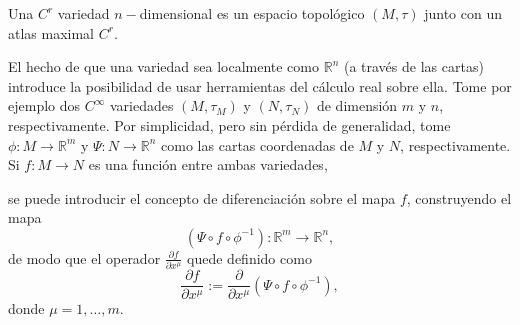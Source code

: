 \begin{center}
\end{center}
\begin{defi}
	Una $C^r$ variedad $n-$dimensional es un espacio topológico $(M,\tau)$ junto con un atlas maximal $C^r$.
\end{defi}
El hecho de que una variedad sea localmente como $\mathbb{R}^n$ (a través de las cartas) introduce la posibilidad de usar herramientas del cálculo real sobre ella. Tome por ejemplo dos $C^\infty$ variedades $(M,\tau_M)$ y $(N,\tau_N)$ de dimensión $m$ y $n$, respectivamente. Por simplicidad, pero sin pérdida de generalidad, tome $\phi:M\rightarrow\mathbb{R}^m$ y $\Psi:N\rightarrow\mathbb{R}^n$ como las cartas coordenadas de $M$ y $N$, respectivamente. Si $f:M\rightarrow N$ es una función entre ambas variedades,

\begin{center}
\end{center}
se puede introducir el concepto de diferenciación sobre el mapa $f$, construyendo el mapa
$$(\Psi\circ f\circ \phi^{-1}):\mathbb{R}^m\rightarrow\mathbb{R}^n,$$
de modo que el operador $\frac{\partial f}{\partial x^\mu}$ quede definido como
$$\frac{\partial f}{\partial x^\mu}:=\frac{\partial }{\partial x^\mu}(\Psi\circ f\circ \phi^{-1}),$$
donde $\mu=1,\dots,m$.
